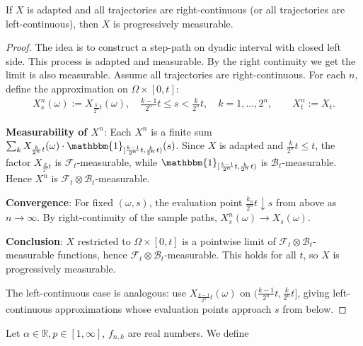 \begin{proposition}
	If $X$ is adapted and all trajectories are right-continuous (or all trajectories are left-continuous), then $X$ is progressively measurable.
\end{proposition}
\begin{proof}
	The idea is to construct a step-path on dyadic interval with closed left side. 
	This process is adapted and measurable. By the right continuity we get the limit is also measurable. 
	Assume all trajectories are right-continuous. For each $n$, define the approximation on $\Omega \times [0, t]$:
	\begin{align*}
		X_s^n(\omega) := X_{\frac{k}{2^n}t}(\omega), \quad \frac{k-1}{2^n}t \le s < \frac{k}{2^n}t, \quad k = 1, \dots, 2^n, \qquad X_t^n := X_t.
	\end{align*}
	
	\textbf{Measurability of $X^n$}: Each $X^n$ is a finite sum $\sum_k X_{\frac{k}{2^n}t}(\omega) \cdot \mathbbm{1}_{[\frac{k-1}{2^n}t, \frac{k}{2^n}t)}(s)$. Since $X$ is adapted and $\frac{k}{2^n}t \le t$, the factor $X_{\frac{k}{2^n}t}$ is $\mathcal{F}_t$-measurable, while $\mathbbm{1}_{[\frac{k-1}{2^n}t, \frac{k}{2^n}t)}$ is $\mathcal{B}_t$-measurable. Hence $X^n$ is $\mathcal{F}_t \otimes \mathcal{B}_t$-measurable.

	\textbf{Convergence}: For fixed $(\omega, s)$, the evaluation point $\frac{k_n}{2^n}t \downarrow s$ from above as $n \to \infty$. By right-continuity of the sample paths, $X^n_s(\omega) \to X_s(\omega)$.

	\textbf{Conclusion}: $X$ restricted to $\Omega \times [0,t]$ is a pointwise limit of $\mathcal{F}_t \otimes \mathcal{B}_t$-measurable functions, hence $\mathcal{F}_t \otimes \mathcal{B}_t$-measurable. This holds for all $t$, so $X$ is progressively measurable.

	The left-continuous case is analogous: use $X_{\frac{k-1}{2^n}t}(\omega)$ on $(\frac{k-1}{2^n}t, \frac{k}{2^n}t]$, giving left-continuous approximations whose evaluation points approach $s$ from below.
\end{proof}

\begin{lemma}
	Let $\alpha \in \mathbb{R}, p \in [1, \infty]$, $f_{n, k}$ are real numbers. We define
\end{lemma}

